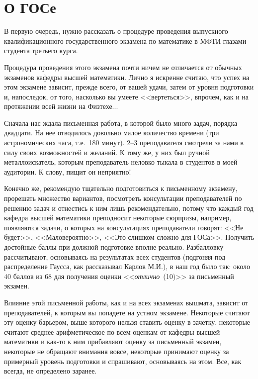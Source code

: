 \chapter*{О ГОСе\footnotemark}

В первую очередь, нужно рассказать о процедуре проведения выпускного квалификационного государственного экзамена по математике в МФТИ глазами студента третьего курса. 

Процедура проведения этого экзамена почти ничем не отличается от обычных экзаменов кафедры высшей математики. 
Лично я искренне считаю, что успех на этом экзамене зависит, прежде всего, от вашей удачи, затем от уровня подготовки и, напоследок, от того, насколько вы умеете <<вертеться>>, впрочем, как и на протяжении всей жизни на Физтехе...

Сначала нас ждала письменная работа, в которой было много задач, порядка двадцати. На нее отводилось довольно малое количество времени (три астрономических часа, т.е.~180 минут). 2--3 преподавателя смотрели за нами в силу своих возможностей и желаний. К тому же, у них был ручной металлоискатель, которым преподаватель неловко тыкала в студентов в моей аудитории. К слову, пищит он неприятно! 

Конечно же, рекомендую тщательно подготовиться к письменному экзамену, прорешать множество вариантов, посмотреть консультации преподавателей по решению задач и отнестись к ним лишь рекомендательно, потому что каждый год кафедра высшей математики преподносит некоторые сюрпризы, например, появляются задачи, о которых на консультациях преподаватели говорят: <<Не будет>>, <<Маловероятно>>, <<Это слишком сложно для ГОСа>>. Получить достойные баллы при должной подготовке вполне реально. Разбалловку рассчитывают, основываясь на результатах всех студентов (подгоняя под распределение Гаусса, как рассказывал Карлов М.И.), в наш год было так: около 40 баллов из 68 для получения оценки <<\textit{отлично}~(10)>> за письменный экзамен.

Влияние этой письменной работы, как и на всех экзаменах вышмата, зависит от преподавателей, к которым вы попадете на устном экзамене. Некоторые считают эту оценку барьером, выше которого нельзя ставить оценку в зачетку, некоторые считают среднее арифметическое по всем оценкам от кафедры высшей математики и как-то к ним прибавляют оценку за письменный экзамен, некоторые не обращают внимания вовсе, некоторые принимают оценку за примерный уровень подготовки и спрашивают, основываясь на этом. Все, как всегда, не определено заранее.

